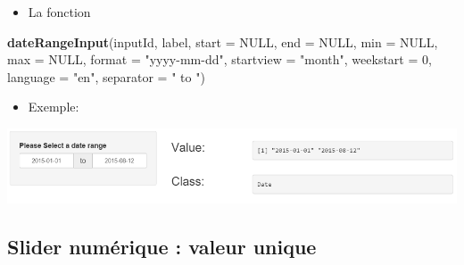 \documentclass[]{article}
\newenvironment{Shaded}{\begin{snugshade}}{\end{snugshade}}
\newcommand{\KeywordTok}[1]{\textcolor[rgb]{0.13,0.29,0.53}{\textbf{#1}}}
\newcommand{\DataTypeTok}[1]{\textcolor[rgb]{0.13,0.29,0.53}{#1}}
\newcommand{\DecValTok}[1]{\textcolor[rgb]{0.00,0.00,0.81}{#1}}
\newcommand{\StringTok}[1]{\textcolor[rgb]{0.31,0.60,0.02}{#1}}
\newcommand{\CommentTok}[1]{\textcolor[rgb]{0.56,0.35,0.01}{\textit{#1}}}
\newcommand{\OtherTok}[1]{\textcolor[rgb]{0.56,0.35,0.01}{#1}}
\newcommand{\NormalTok}[1]{#1}
\providecommand{\tightlist}{%
  \setlength{\itemsep}{0pt}\setlength{\parskip}{0pt}}
\begin{document}
\begin{itemize}
\tightlist
\item
  La fonction
\end{itemize}

\begin{Shaded}
\begin{Highlighting}[]
\KeywordTok{dateRangeInput}\NormalTok{(inputId, label, }\DataTypeTok{start =} \OtherTok{NULL}\NormalTok{, }\DataTypeTok{end =} \OtherTok{NULL}\NormalTok{, }\DataTypeTok{min =} \OtherTok{NULL}\NormalTok{, }\DataTypeTok{max =} \OtherTok{NULL}\NormalTok{,}
               \DataTypeTok{format =} \StringTok{"yyyy-mm-dd"}\NormalTok{, }\DataTypeTok{startview =} \StringTok{"month"}\NormalTok{, }\DataTypeTok{weekstart =} \DecValTok{0}\NormalTok{,}
               \DataTypeTok{language =} \StringTok{"en"}\NormalTok{, }\DataTypeTok{separator =} \StringTok{" to "}\NormalTok{)}
\end{Highlighting}
\end{Shaded}

\begin{itemize}
\tightlist
\item
  Exemple:
\end{itemize}

\begin{Shaded}
\end{Shaded}

\includegraphics{img/date_range.png}

\subsection{Slider numérique : valeur
unique}\label{slider-numerique-valeur-unique}
\end{document}
